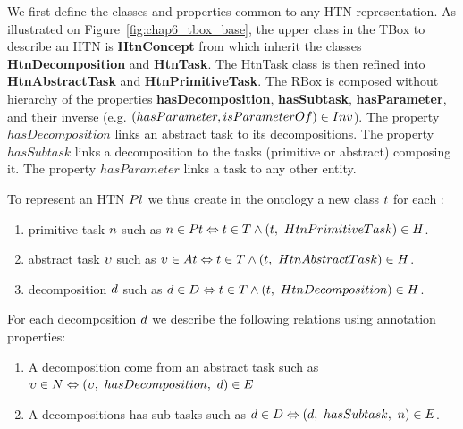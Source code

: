 We first define the classes and properties common to any HTN representation.
As illustrated on Figure~\ref{fig:chap6_tbox_base}, the upper class in the TBox to describe an HTN is \textbf{HtnConcept} from which inherit the classes \textbf{HtnDecomposition} and \textbf{HtnTask}. The HtnTask class is then refined into \textbf{HtnAbstractTask} and \textbf{HtnPrimitiveTask}.
The RBox is composed without hierarchy of the properties \textbf{hasDecomposition}, \textbf{hasSubtask}, \textbf{hasParameter}, and their inverse (e.g. $(hasParameter, isParameterOf) \in Inv$). The property $hasDecomposition$ links an abstract task to its decompositions. The property $hasSubtask$ links a decomposition to the tasks (primitive or abstract) composing it. The property $hasParameter$ links a task to any other entity.

To represent an HTN $Pl$ we thus create in the ontology a new class $t$ for each :
\begin{enumerate}
	\item primitive task $n$ such as 
$n \in Pt \Leftrightarrow t \in T \wedge (t,\ HtnPrimitiveTask) \in H$.
	\item abstract task $\upsilon$ such as $\upsilon \in At \Leftrightarrow t \in T \wedge (t,\ HtnAbstractTask) \in H$.
	\item decomposition $d$ such as $d \in D \Leftrightarrow t \in T \wedge (t,\ HtnDecomposition) \in H$.
\end{enumerate}

For each decomposition $d$ we describe the following relations using annotation properties:
\begin{enumerate}
	\item A decomposition come from an abstract task such as $\upsilon \in N \Leftrightarrow (\upsilon,\ hasDecomposition,\ d) \in E$
	\item A decompositions has sub-tasks such as $d \in D \Leftrightarrow (d,\ hasSubtask,\ n) \in E$.
\end{enumerate}

